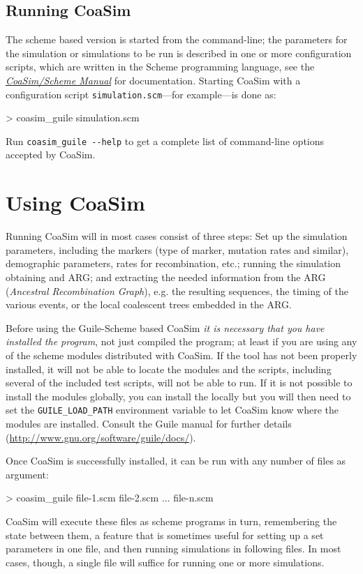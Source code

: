 \documentclass{manual}
\begin{document}
\subsection{Running CoaSim}

The scheme based version is started from the command-line; the
parameters for the simulation or simulations to be run is described in
one or more configuration scripts, which are written in the Scheme
programming language, see the
\href{http://www.daimi.au.dk/~mailund/CoaSim/download/guile-manual-4.1.pdf}%
{\emph{CoaSim/Scheme Manual}} for documentation.  Starting CoaSim with
a configuration script \verb?simulation.scm?---for example---is done
as:
\begin{code}
> coasim_guile simulation.scm
\end{code}
Run \verb?coasim_guile --help? to get a complete list of command-line
options accepted by CoaSim.

\section{Using CoaSim}

Running CoaSim will in most cases consist of three steps: Set up the
simulation parameters, including the markers (type of marker, mutation
rates and similar), demographic parameters, rates for recombination,
etc.; running the simulation obtaining and ARG; and extracting the
needed information from the ARG (\emph{Ancestral Recombination
  Graph}), e.g. the resulting sequences, the timing of the various
events, or the local coalescent trees embedded in the ARG.

Before using the Guile-Scheme based CoaSim \emph{it is necessary that
  you have installed the program}, not just compiled the program; at
least if you are using any of the scheme modules distributed with
CoaSim.  If the tool has not been properly installed, it will not be
able to locate the modules and the scripts, including several of the
included test scripts, will not be able to run.  If it is not possible
to install the modules globally, you can install the locally but you
will then need to set the \verb?GUILE_LOAD_PATH? environment variable
to let CoaSim know where the modules are installed.  Consult the Guile
manual for further details
(\url{http://www.gnu.org/software/guile/docs/}).

Once CoaSim is successfully installed, it can be run with any number
of files as argument:
\begin{code}
> coasim_guile file-1.scm file-2.scm ... file-n.scm
\end{code}
CoaSim will execute these files as scheme programs in turn,
remembering the state between them, a feature that is sometimes useful
for setting up a set parameters in one file, and then running
simulations in following files.  In most cases, though, a single file
will suffice for running one or more simulations.
\end{document}
